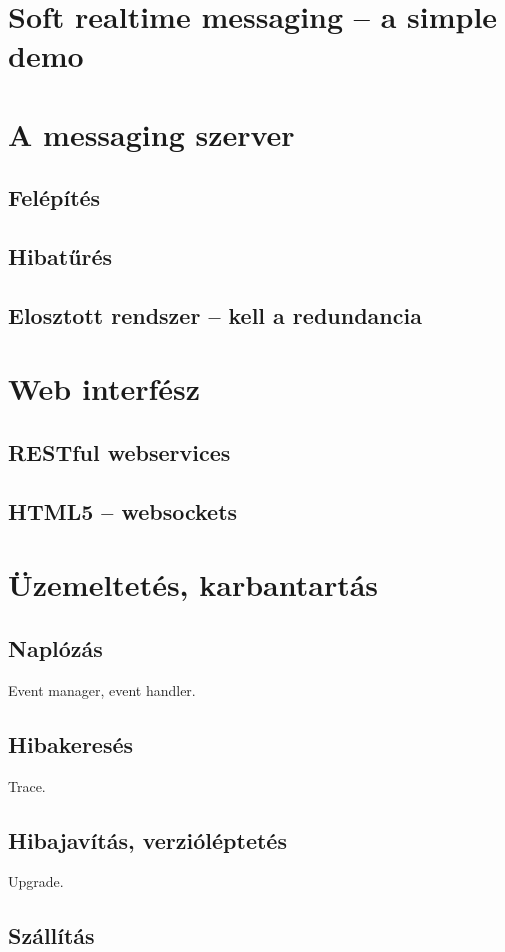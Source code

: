 \documentclass[12pt, a4paper, oneside]{book}
\begin{document}
\chapter{Soft realtime messaging -- a simple demo}

\chapter{A messaging szerver}
\section{Felépítés}
\section{Hibatűrés}
\section{Elosztott rendszer -- kell a redundancia}

\chapter{Web interfész}
\section{RESTful webservices}
\section{HTML5 -- websockets}

\chapter{Üzemeltetés, karbantartás}
\section{Naplózás}
Event manager, event handler.
\section{Hibakeresés}
Trace.
\section{Hibajavítás, verzióléptetés}
Upgrade.
\section{Szállítás}
\end{document}
